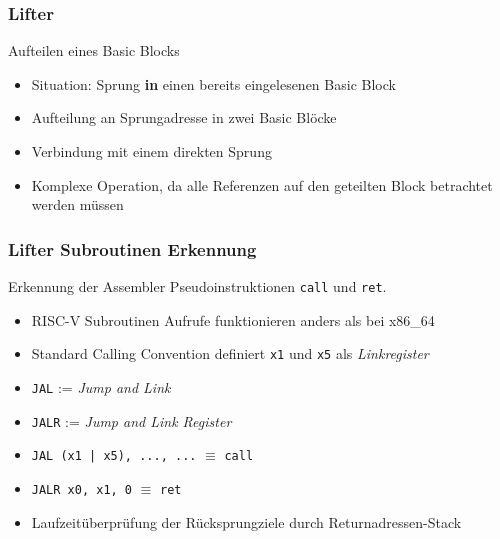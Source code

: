 
\begin{frame}
    \frametitle{Lifter}{Aufteilen eines Basic Blocks}
    \begin{itemize}
        \setlength{\itemsep}{1em}
        \item Situation: Sprung \textbf{in} einen bereits eingelesenen Basic Block
        \item Aufteilung an Sprungadresse in zwei Basic Blöcke
        \item Verbindung mit einem direkten Sprung
        \item Komplexe Operation, da alle Referenzen auf den geteilten Block betrachtet werden müssen
    \end{itemize}
\end{frame}
\clearpage


\begin{frame}
    \frametitle{Lifter Subroutinen Erkennung}{Erkennung der Assembler Pseudoinstruktionen \texttt{call} und \texttt{ret}.}
    \begin{itemize}
        \setlength{\itemsep}{0.8em}
        \item RISC-V Subroutinen Aufrufe funktionieren anders als bei x86\_64
        \item Standard Calling Convention definiert \texttt{x1} und \texttt{x5} als \textit{Linkregister}
        \item \texttt{JAL} := \textit{Jump and Link}
        \item \texttt{JALR} := \textit{Jump and Link Register}
        \item \texttt{JAL (x1 | x5), ..., ...} $\equiv$ \texttt{call}
        \item \texttt{JALR x0, x1, 0} $\equiv$ \texttt{ret}
        \item Laufzeitüberprüfung der Rücksprungziele durch Returnadressen-Stack
    \end{itemize}
\end{frame}
\clearpage

